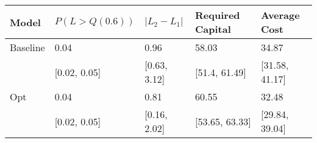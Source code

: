 \begin{tabular}{lllll}
\toprule
    Model & $P(L > Q(0.6))$ & $|L_2 - L_1|$ & Required Capital &    Average Cost \\
\midrule
 Baseline &            0.04 &          0.96 &            58.03 &           34.87 \\
          &    [0.02, 0.05] &  [0.63, 3.12] &    [51.4, 61.49] &  [31.58, 41.17] \\
      Opt &            0.04 &          0.81 &            60.55 &           32.48 \\
          &    [0.02, 0.05] &  [0.16, 2.02] &   [53.65, 63.33] &  [29.84, 39.04] \\
\bottomrule
\end{tabular}
